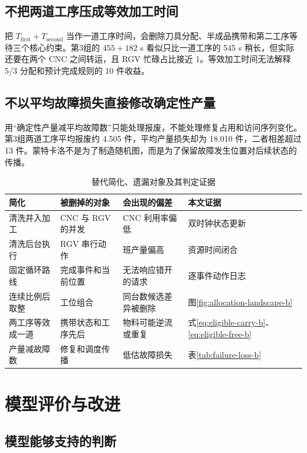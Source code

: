 \documentclass[UTF8,11pt,a4paper]{ctexart}
\begin{document}
\subsection{不把两道工序压成等效加工时间}

把 $T_{\mathrm{first}}+T_{\mathrm{second}}$ 当作一道工序时间，会删除刀具分配、半成品携带和第二工序等待三个核心约束。第3组的 $455+182$ s 看似只比一道工序的 545 s 稍长，但实际还要在两个 CNC 之间转运，且 RGV 忙碌占比接近 1。等效加工时间无法解释 5/3 分配和预计完成规则的 10 件收益。

\subsection{不以平均故障损失直接修改确定性产量}

用“确定性产量减平均故障数”只能处理报废，不能处理修复占用和访问序列变化。第3组两道工序平均报废约 4.505 件，平均产量损失却为 18.010 件，二者相差超过 13 件。蒙特卡洛不是为了制造随机图，而是为了保留故障发生位置对后续状态的传播。

\begin{table}[H]
\centering
\caption{替代简化、遗漏对象及其判定证据}
\label{tab:rejected-b}
\small
\begin{tabularx}{\textwidth}{p{3.4cm}p{4.2cm}p{4.5cm}X}
\toprule
简化 & 被删掉的对象 & 会出现的偏差 & 本文证据\\
\midrule
清洗并入加工 & CNC 与 RGV 的并发 & CNC 利用率偏低 & 双时钟状态更新\\
清洗后台执行 & RGV 串行动作 & 班产量偏高 & 资源时间闭合\\
固定循环路线 & 完成事件和当前位置 & 无法响应错开的请求 & 逐事件动作日志\\
连续比例后取整 & 工位组合 & 同台数候选差异被删除 & 图\ref{fig:allocation-landscape-b}\\
两工序等效成一道 & 携带状态和工序先后 & 物料可能逆流或重复 & 式\eqref{eq:eligible-carry-b}、\eqref{eq:eligible-free-b}\\
产量减故障数 & 修复和调度传播 & 低估故障损失 & 表\ref{tab:failure-loss-b}\\
\bottomrule
\end{tabularx}
\end{table}

\section{模型评价与改进}

\subsection{模型能够支持的判断}
\end{document}
